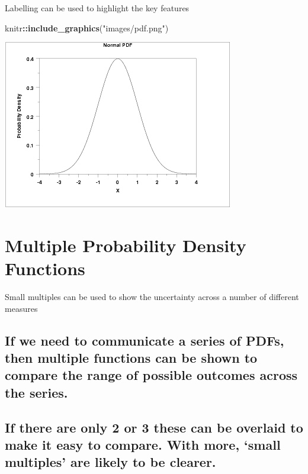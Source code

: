 \documentclass[]{book}
\newenvironment{Shaded}{\begin{snugshade}}{\end{snugshade}}
\newcommand{\KeywordTok}[1]{\textcolor[rgb]{0.13,0.29,0.53}{\textbf{#1}}}
\newcommand{\StringTok}[1]{\textcolor[rgb]{0.31,0.60,0.02}{#1}}
\newcommand{\OperatorTok}[1]{\textcolor[rgb]{0.81,0.36,0.00}{\textbf{#1}}}
\newcommand{\NormalTok}[1]{#1}
\begin{document}
 Labelling can be used to highlight the key features

\begin{Shaded}
\begin{Highlighting}[]
\NormalTok{knitr}\OperatorTok{::}\KeywordTok{include_graphics}\NormalTok{(}\StringTok{"images/pdf.png"}\NormalTok{)}
\end{Highlighting}
\end{Shaded}

\begin{center}\includegraphics{images/pdf} \end{center}

\section{Multiple Probability Density
Functions}\label{multiple-probability-density-functions}

 Small multiples can be used to show the uncertainty across a number of
different measures

\subsection{If we need to communicate a series of PDFs, then multiple
functions can be shown to compare the range of possible outcomes across
the
series.}\label{if-we-need-to-communicate-a-series-of-pdfs-then-multiple-functions-can-be-shown-to-compare-the-range-of-possible-outcomes-across-the-series.}

\subsection{\texorpdfstring{If there are only 2 or 3 these can be
overlaid to make it easy to compare. With more, `small multiples' are
likely to be
clearer.}{If there are only 2 or 3 these can be overlaid to make it easy to compare. With more, small multiples are likely to be clearer.}}\label{if-there-are-only-2-or-3-these-can-be-overlaid-to-make-it-easy-to-compare.-with-more-small-multiples-are-likely-to-be-clearer.}
\end{document}
